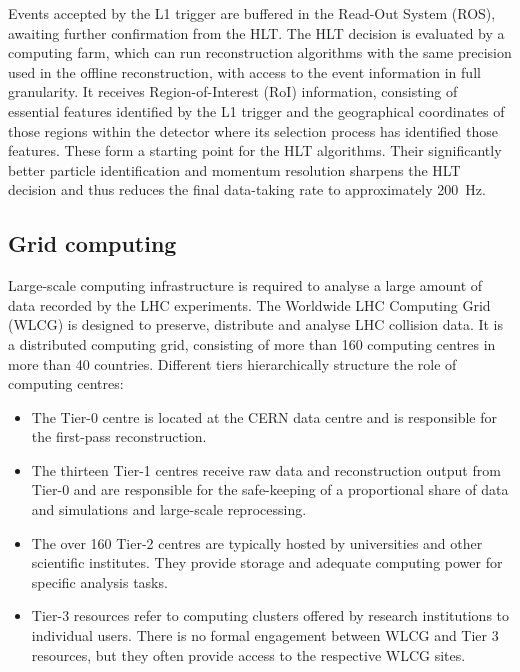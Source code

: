 Events accepted by the L1 trigger are buffered in the Read-Out System (ROS), awaiting further confirmation from the HLT.
The HLT decision is evaluated by a computing farm, which can run reconstruction algorithms with the same precision used in the offline reconstruction, with access to the event information in full granularity. It receives Region-of-Interest (RoI) information, consisting of essential features identified by the L1 trigger and the geographical coordinates of those regions within the detector where its selection process has identified those features. These form a starting point for the HLT algorithms. Their significantly better particle identification and momentum resolution sharpens the HLT decision and thus reduces the final data-taking rate to approximately \SI{200}{\hertz}.

\subsection{Grid computing}
\label{sec:experiment:ATLAS:computing}
Large-scale computing infrastructure is required to analyse a large amount of data recorded by the LHC experiments.
The Worldwide LHC Computing Grid (WLCG) is designed to preserve, distribute and analyse LHC collision data. It is a distributed computing grid, consisting of more than \num{160} computing centres in more than 40 countries. Different tiers hierarchically structure the role of  computing centres:
\begin{itemize}
    \item The Tier-0 centre is located at the CERN data centre and is responsible for the first-pass reconstruction.
    \item The thirteen Tier-1 centres receive raw data and reconstruction output from Tier-0 and are responsible for the safe-keeping of a proportional share of data and simulations and large-scale reprocessing.
    \item The over 160 Tier-2 centres are typically hosted by universities and other scientific institutes. They provide storage and adequate computing power for specific analysis tasks.
    \item Tier-3 resources refer to computing clusters offered by research institutions to individual users. There is no formal engagement between WLCG and Tier 3 resources, but they often provide access to the respective WLCG sites.
\end{itemize}


